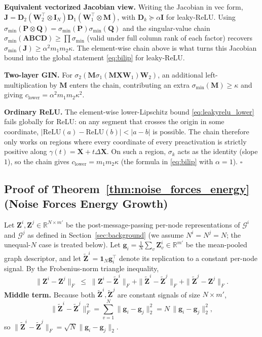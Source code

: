 \textbf{Equivalent vectorized Jacobian view.} Writing the Jacobian in vec form, $\mathbf{J}=\mathbf{D}_2(\mathbf{W}_2^\top\otimes\mathbf{I}_N)\mathbf{D}_1(\mathbf{W}_1^\top\otimes\mathbf{M})$, with $\mathbf{D}_k\succeq\alpha\mathbf{I}$ for leaky-ReLU. Using $\sigma_{\min}(\mathbf{P}\otimes\mathbf{Q})=\sigma_{\min}(\mathbf{P})\sigma_{\min}(\mathbf{Q})$ and the singular-value chain $\sigma_{\min}(\mathbf{ABCD})\geq\prod\sigma_{\min}$ (valid under full column rank of each factor) recovers $\sigma_{\min}(\mathbf{J})\geq\alpha^2 m_1 m_2 \kappa$. The element-wise chain above is what turns this Jacobian bound into the global statement \eqref{eq:bilip} for leaky-ReLU.

\textbf{Two-layer GIN.} For $\sigma_2(\mathbf{M}\sigma_1(\mathbf{M}\mathbf{X}\mathbf{W}_1)\mathbf{W}_2)$, an additional left-multiplication by $\mathbf{M}$ enters the chain, contributing an extra $\sigma_{\min}(\mathbf{M})\geq\kappa$ and giving $c_{\text{lower}}=\alpha^2 m_1 m_2 \kappa^2$.

\textbf{Ordinary ReLU.} The element-wise lower-Lipschitz bound \eqref{eq:leakyrelu_lower} fails globally for ReLU: on any segment that crosses the origin in some coordinate, $|\mathrm{ReLU}(a)-\mathrm{ReLU}(b)|<|a-b|$ is possible. The chain therefore only works on regions where every coordinate of every preactivation is strictly positive along $\gamma(t)=\mathbf{X}+t\Delta\mathbf{X}$. On such a region, $\sigma_k$ acts as the identity (slope $1$), so the chain gives $c_{\text{lower}}=m_1 m_2 \kappa$ (the formula in \eqref{eq:bilip} with $\alpha=1$). $\square$

\subsection{Proof of Theorem~\ref{thm:noise_forces_energy} (Noise Forces Energy Growth)}

Let $\mathbf{Z}^i,\mathbf{Z}^j\in\mathbb{R}^{N\times m'}$ be the post-message-passing per-node representations of $\mathcal{G}^i$ and $\mathcal{G}^j$ as defined in Section~\ref{sec:background} (we assume $N^i=N^j=N$; the unequal-$N$ case is treated below). Let $\mathbf{g}_i=\frac{1}{N}\sum_v\mathbf{Z}^i_v\in\mathbb{R}^{m'}$ be the mean-pooled graph descriptor, and let $\widetilde{\mathbf{Z}}^i=\mathbf{1}_N\mathbf{g}_i^\top$ denote its replication to a constant per-node signal. By the Frobenius-norm triangle inequality,
\begin{equation}
\|\mathbf{Z}^i-\mathbf{Z}^j\|_F \;\le\; \|\mathbf{Z}^i-\widetilde{\mathbf{Z}}^i\|_F + \|\widetilde{\mathbf{Z}}^i-\widetilde{\mathbf{Z}}^j\|_F + \|\widetilde{\mathbf{Z}}^j-\mathbf{Z}^j\|_F.
\end{equation}
\textbf{Middle term.} Because both $\widetilde{\mathbf{Z}}^i,\widetilde{\mathbf{Z}}^j$ are constant signals of size $N\times m'$,
\begin{equation}
\|\widetilde{\mathbf{Z}}^i-\widetilde{\mathbf{Z}}^j\|_F^2=\sum_{v=1}^N\|\mathbf{g}_i-\mathbf{g}_j\|_2^2=N\,\|\mathbf{g}_i-\mathbf{g}_j\|_2^2,
\end{equation}
so $\|\widetilde{\mathbf{Z}}^i-\widetilde{\mathbf{Z}}^j\|_F=\sqrt{N}\|\mathbf{g}_i-\mathbf{g}_j\|_2$.

